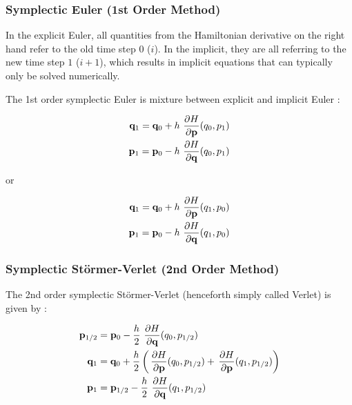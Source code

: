 \subsubsection{Symplectic Euler (1st Order Method)}
In the explicit Euler, all quantities from the Hamiltonian derivative on the right hand refer to the old time step \(0\) ($i$). In the implicit, they are all referring to the new time step \(1\) ($i+1$), which results in implicit equations that can typically only be solved numerically.

The 1st order symplectic Euler is mixture between explicit and implicit Euler \cite{Hairer}:

\begin{equation}
    \begin{split} \label{eq:symplectic-euler1}
        \mathbf{q}_1 = \mathbf{q}_0 + h \operatorname{}\frac{\partial H}{\partial \mathbf{p}}(q_0, p_1) \\
        \mathbf{p}_1 = \mathbf{p}_0 - h \operatorname{}\frac{\partial H}{\partial \mathbf{q}}(q_0, p_1)
    \end{split}
\end{equation}

or

\begin{equation}
    \begin{split} \label{eq:symplectic-euler2}
        \mathbf{q}_1 = \mathbf{q}_0 + h \operatorname{}\frac{\partial H}{\partial \mathbf{p}}(q_1, p_0) \\
        \mathbf{p}_1 = \mathbf{p}_0 - h \operatorname{}\frac{\partial H}{\partial \mathbf{q}}(q_1, p_0)
    \end{split}
\end{equation}

\subsubsection{Symplectic Störmer-Verlet (2nd Order Method)}

The 2nd order symplectic Störmer-Verlet (henceforth simply called Verlet) is given by \cite{Hairer}:

\begin{equation}
    \begin{split} \label{eq:symplectic-verlet1}
        \mathbf{p}_{1/2} &= \mathbf{p}_0 - \frac{h}{2} \operatorname{}\frac{\partial H}{\partial \mathbf{q}}(q_0, p_{1/2}) \\
        \mathbf{q}_1 &= \mathbf{q}_0 + \frac{h}{2} \left( \operatorname{}\frac{\partial H}{\partial \mathbf{p}}(q_0, p_{1/2}) + \operatorname{}\frac{\partial H}{\partial \mathbf{p}}(q_1, p_{1/2}) \right) \\
        \mathbf{p}_{1} &= \mathbf{p}_{1/2} - \frac{h}{2} \operatorname{}\frac{\partial H}{\partial \mathbf{q}}(q_1, p_{1/2}) \\
    \end{split}
\end{equation}


